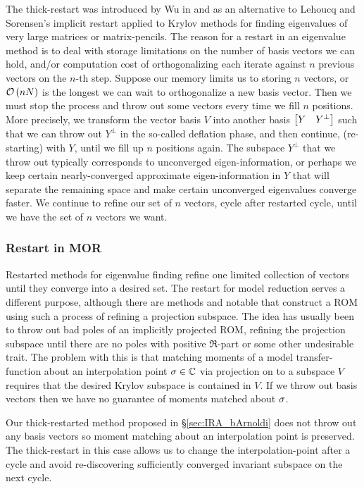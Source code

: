 The thick-restart was introduced by Wu  in \cite{dynamicthick}  and \cite{wu1999thick} as an alternative to Lehoucq and Sorensen's implicit restart applied to Krylov methods for finding eigenvalues of very large matrices or matrix-pencils.  The reason for a restart in an eigenvalue method is to deal with storage limitations on the number of basis vectors we can hold, and/or computation cost of orthogonalizing each iterate against $n$ previous vectors on the $n$-th step.   Suppose our memory limits us to storing $n$ vectors, or $\mathcal{O}\left( nN \right)$ is the longest we can wait to orthogonalize a new basis vector.   Then we must stop the process and throw out some vectors every time we fill $n$ positions.  More precisely, we transform the vector basis $V$ into another basis $\begin{bmatrix} Y & Y^\perp\end{bmatrix}$ such that we can throw out $Y^\perp$ in the so-called deflation phase, and then continue, (re-starting) with $Y$, until we fill up $n$ positions again.   The subspace $Y^\perp$ that we throw out typically corresponds to unconverged eigen-information, or perhaps we keep certain nearly-converged approximate eigen-information in $Y$ that will separate the remaining space and make certain unconverged eigenvalues converge faster.   We continue to refine our set of $n$ vectors, cycle after restarted cycle, until we have the set of $n$ vectors we want.  

\subsubsection{Restart in MOR}
Restarted methods for eigenvalue finding refine one limited collection of vectors until they converge into a desired set. 
The restart for model reduction serves a different purpose, although there are methods \cite{jaimoukha1997implicitMOR} and notable \cite{grimme1996restart} that construct a ROM using such a process of refining a projection subspace.  The idea has usually been to throw out bad poles of an implicitly projected ROM, refining the projection subspace until there are no poles with positive $\Re$-part or some other undesirable trait.   The problem with this is that matching moments of a model transfer-function about an interpolation point $\sigma\in\mathbb{C}$ via projection on to a subspace $V$ requires that the desired Krylov subspace is contained in $V$.  If we throw out basis vectors then we have no guarantee of moments matched about $\sigma$. 
 
Our thick-restarted method proposed in \S\ref{sec:IRA_bArnoldi} does not throw out any basis vectors so moment matching about an interpolation point is preserved.  The thick-restart in this case allows us to change the interpolation-point after a cycle and avoid re-discovering sufficiently converged invariant subspace on the next cycle.



